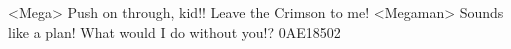 <Mega> Push on through, kid!! Leave the Crimson to me! 
<Megaman> Sounds like a plan! What would I do without you!? 
{0A}{E1}{85}{02}
